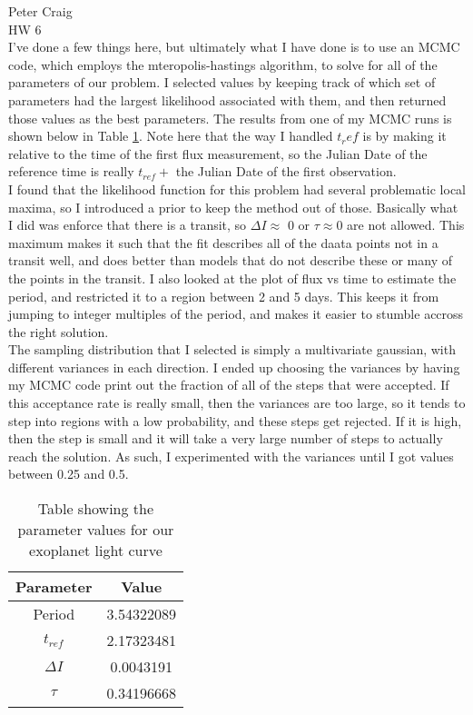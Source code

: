 \documentclass{article}
\begin{document}
\noindent Peter Craig\\
HW 6\\


I've done a few things here, but ultimately what I have done is to use an MCMC code, which employs the mteropolis-hastings algorithm, to solve for all of the parameters of our problem. I selected values by keeping track of which set of parameters had the largest likelihood associated with them, and then returned those values as the best parameters. The results from one of my MCMC runs is shown below in Table \ref{params}. Note here that the way I handled $t_ref$ is by making it relative to the time of the first flux measurement, so the Julian Date of the reference time is really $t_{ref} + $ the Julian Date of the first observation.\\

I found that the likelihood function for this problem had several problematic local maxima, so I introduced a prior to keep the method out of those. Basically what I did was enforce that there is a transit, so $\Delta I \approx$ 0 or $\tau \approx 0$ are not allowed. This maximum makes it such that the fit describes all of the daata points not in a transit well, and does better than models that do not describe these or many of the points in the transit. I also looked at the plot of flux vs time to estimate the period, and restricted it to a region between 2 and 5 days. This keeps it from jumping to integer multiples of the period, and makes it easier to stumble accross the right solution.\\

The sampling distribution that I selected is simply a multivariate gaussian, with different variances in each direction. I ended up choosing the variances by having my MCMC code print out the fraction of all of the steps that were accepted. If this acceptance rate is really small, then the variances are too large, so it tends to step into regions with a low probability, and these steps get rejected. If it is high, then the step is small and it will take a very large number of steps to actually reach the solution. As such, I experimented with the variances until I got values between 0.25 and 0.5.\\



\begin{table}[H]
\begin{center}
\caption{Table showing the parameter values for our exoplanet light curve} \label{params}
\begin{tabular}{|c|c|}
\hline
Parameter & Value\\
\hline
Period & 3.54322089\\
\hline
$t_{ref}$ &  2.17323481\\
\hline
$\Delta I$ & 0.0043191\\
\hline
$\tau$ & 0.34196668\\
\hline
\end{tabular}
\end{center}
\end{table}
\end{document}
